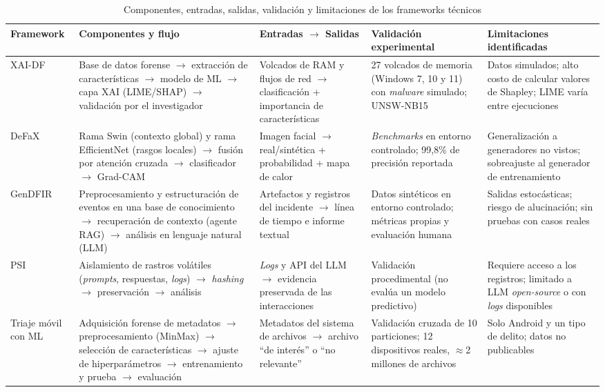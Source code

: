 \documentclass[journal]{IEEEtran}
\begin{document}
\begin{table}[!t]
\renewcommand{\arraystretch}{1.25}
\setlength{\tabcolsep}{3pt}
\caption{Componentes, entradas, salidas, validación y limitaciones de los frameworks técnicos}
\label{tab:fw_arq}
\centering
\scriptsize
\begin{tabular}{|L{1.9cm}|L{4.3cm}|L{3.4cm}|L{3.3cm}|L{3.4cm}|}
\hline
\textbf{Framework} & \textbf{Componentes y flujo} & \textbf{Entradas $\rightarrow$ Salidas} & \textbf{Validación experimental} & \textbf{Limitaciones identificadas} \\
\hline
XAI-DF & Base de datos forense $\rightarrow$ extracción de características $\rightarrow$ modelo de ML $\rightarrow$ capa XAI (LIME/SHAP) $\rightarrow$ validación por el investigador & Volcados de RAM y flujos de red $\rightarrow$ clasificación + importancia de características & 27 volcados de memoria (Windows 7, 10 y 11) con \textit{malware} simulado; UNSW-NB15 & Datos simulados; alto costo de calcular valores de Shapley; LIME varía entre ejecuciones \\
\hline
DeFaX & Rama Swin (contexto global) y rama EfficientNet (rasgos locales) $\rightarrow$ fusión por atención cruzada $\rightarrow$ clasificador $\rightarrow$ Grad-CAM & Imagen facial $\rightarrow$ real/sintética + probabilidad + mapa de calor & \textit{Benchmarks} en entorno controlado; 99,8\% de precisión reportada & Generalización a generadores no vistos; sobreajuste al generador de entrenamiento \\
\hline
GenDFIR & Preprocesamiento y estructuración de eventos en una base de conocimiento $\rightarrow$ recuperación de contexto (agente RAG) $\rightarrow$ análisis en lenguaje natural (LLM) & Artefactos y registros del incidente $\rightarrow$ línea de tiempo e informe textual & Datos sintéticos en entorno controlado; métricas propias y evaluación humana & Salidas estocásticas; riesgo de alucinación; sin pruebas con casos reales \\
\hline
PSI & Aislamiento de rastros volátiles (\textit{prompts}, respuestas, \textit{logs}) $\rightarrow$ \textit{hashing} $\rightarrow$ preservación $\rightarrow$ análisis & \textit{Logs} y API del LLM $\rightarrow$ evidencia preservada de las interacciones & Validación procedimental (no evalúa un modelo predictivo) & Requiere acceso a los registros; limitado a LLM \textit{open-source} o con \textit{logs} disponibles \\
\hline
Triaje móvil con ML & Adquisición forense de metadatos $\rightarrow$ preprocesamiento (MinMax) $\rightarrow$ selección de características $\rightarrow$ ajuste de hiperparámetros $\rightarrow$ entrenamiento y prueba $\rightarrow$ evaluación & Metadatos del sistema de archivos $\rightarrow$ archivo ``de interés'' o ``no relevante'' & Validación cruzada de 10 particiones; 12 dispositivos reales, $\approx$2 millones de archivos & Solo Android y un tipo de delito; datos no publicables \\

\end{tabular}
\end{table}
\end{document}
